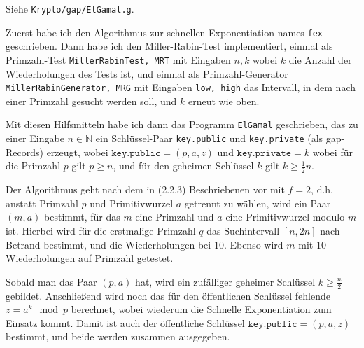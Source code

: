 Siehe \texttt{Krypto/gap/ElGamal.g}.

Zuerst habe ich den Algorithmus zur schnellen Exponentiation names \texttt{fex} geschrieben. Dann habe ich
den Miller-Rabin-Test implementiert, einmal als Primzahl-Test \texttt{MillerRabinTest, MRT} mit Eingaben $n, k$
wobei $k$ die Anzahl der Wiederholungen des Tests ist, und einmal als Primzahl-Generator \texttt{MillerRabinGenerator, MRG}
mit Eingaben \texttt{low, high} das Intervall, in dem nach einer Primzahl gesucht werden soll, und $k$ erneut wie oben.

Mit diesen Hilfsmitteln habe ich dann das Programm \texttt{ElGamal} geschrieben, das zu einer Eingabe $n \in \mathbb{N}$
ein Schlüssel-Paar \texttt{key.public} und \texttt{key.private} (als gap-Records) erzeugt, wobei $\mathtt{key.public} = (p, a, z)$ und 
$\mathtt{key.private} = k$ wobei für die Primzahl $p$ gilt $p \geq n$, und für den geheimen Schlüssel $k$ gilt $k \geq \frac{1}{2}n$.

Der Algorithmus geht nach dem in (2.2.3) Beschriebenen vor mit $f = 2$, d.h. anstatt Primzahl $p$ und Primitivwurzel $a$ getrennt zu wählen,
wird ein Paar $(m, a)$ bestimmt, für das $m$ eine Primzahl und $a$ eine Primitivwurzel modulo $m$ ist. Hierbei wird für die
erstmalige Primzahl $q$ das Suchintervall $[n, 2n]$ nach Betrand bestimmt, und die Wiederholungen bei $10$. Ebenso wird $m$ mit
$10$ Wiederholungen auf Primzahl getestet.

Sobald man das Paar $(p, a)$ hat, wird ein zufälliger geheimer Schlüssel $k \geq \frac{n}{2}$ gebildet.
Anschließend wird noch das für den öffentlichen Schlüssel fehlende $z = a^{k} \mod p$ berechnet, wobei wiederum
die Schnelle Exponentiation zum Einsatz kommt.
Damit ist auch der öffentliche Schlüssel $\mathtt{key.public} = (p, a, z)$ bestimmt, und beide werden zusammen ausgegeben.
